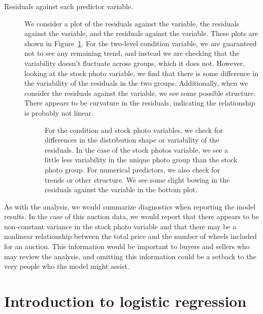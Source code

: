 \begin{description}
\item[Residuals against each predictor variable.]
    We consider a plot of the residuals against the
     variable, the residuals against
    the  variable,
    and the residuals against the  variable.
    These plots are shown in Figure~\ref{mkDiagnosticEvsVariables}.
    For the two-level condition variable, we are guaranteed not
    to see any remaining trend, and instead we are checking that
    the variability doesn't fluctuate across groups,
    which it does not.
    However, looking at the stock photo variable,
    we find that there is some difference in the variability
    of the residuals in the two groups.
    Additionally, when we consider the residuals against the
     variable, we see some possible structure.
    There appears to be curvature in the residuals,
    indicating the relationship is probably not linear.

\begin{figure}
  \centering
  \caption{For the condition and stock photo variables, we check
      for differences in the distribution shape or variability of
      the residuals.
      In the case of the stock photos variable, we see a little
      less variability in the unique photo group than the stock
      photo group.
      For numerical predictors, we also check for trends or other
      structure.
      We see some slight bowing in the residuals against the
       variable in the bottom plot.}
  \label{mkDiagnosticEvsVariables}
\end{figure}

\end{description}

As with the  analysis, we would summarize
diagnostics when reporting the model results.
In the case of this auction data,
we would report that there appears to be non-constant variance
in the stock photo variable and that there may be a nonlinear
relationship between the total price and the number of wheels
included for an auction.
This information would be important to buyers and sellers who
may review the analysis, and omitting this information could be
a setback to the very people who the model might assist.





\section{Introduction to logistic regression}
\label{logisticRegression}

